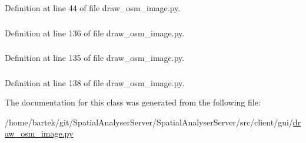 Definition at line 44 of file draw\_\-osm\_\-image.py.

\hypertarget{classsrc_1_1client_1_1gui_1_1draw__osm__image_1_1Ui__DrawOSMImage_ac26b73a5094217e2408b232237c25001}{
\subsubsection[{root}]{}}
\label{classsrc_1_1client_1_1gui_1_1draw__osm__image_1_1Ui__DrawOSMImage_ac26b73a5094217e2408b232237c25001}


Definition at line 136 of file draw\_\-osm\_\-image.py.

\hypertarget{classsrc_1_1client_1_1gui_1_1draw__osm__image_1_1Ui__DrawOSMImage_a1a28203ecd95b2c4a90f98e34c159d83}{
\subsubsection[{stack}]{}}
\label{classsrc_1_1client_1_1gui_1_1draw__osm__image_1_1Ui__DrawOSMImage_a1a28203ecd95b2c4a90f98e34c159d83}


Definition at line 135 of file draw\_\-osm\_\-image.py.

\hypertarget{classsrc_1_1client_1_1gui_1_1draw__osm__image_1_1Ui__DrawOSMImage_a8240ceeebe5f3de2bf9a4fae20f3ef3c}{
\subsubsection[{text\_\-parts}]{}}
\label{classsrc_1_1client_1_1gui_1_1draw__osm__image_1_1Ui__DrawOSMImage_a8240ceeebe5f3de2bf9a4fae20f3ef3c}


Definition at line 138 of file draw\_\-osm\_\-image.py.



The documentation for this class was generated from the following file:\begin{DoxyCompactItemize}
\item 
/home/bartek/git/SpatialAnalyserServer/SpatialAnalyserServer/src/client/gui/\hyperlink{draw__osm__image_8py}{draw\_\-osm\_\-image.py}\end{DoxyCompactItemize}
